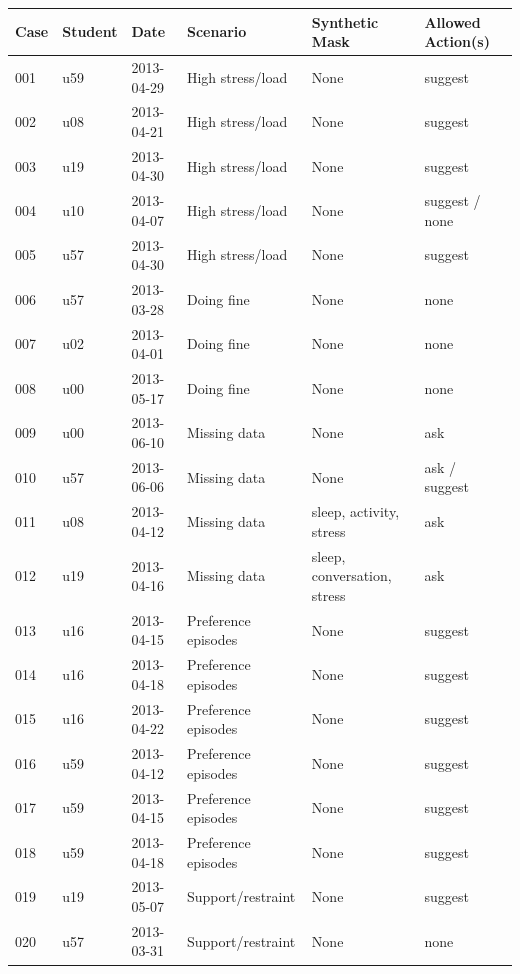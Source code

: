 \begin{tabular}{lllp{3.0cm}p{3.7cm}l}
\toprule
Case & Student & Date & Scenario & Synthetic Mask & Allowed Action(s) \\
\midrule
001 & u59 & 2013-04-29 & High stress/load & None & suggest \\
002 & u08 & 2013-04-21 & High stress/load & None & suggest \\
003 & u19 & 2013-04-30 & High stress/load & None & suggest \\
004 & u10 & 2013-04-07 & High stress/load & None & suggest / none \\
005 & u57 & 2013-04-30 & High stress/load & None & suggest \\
006 & u57 & 2013-03-28 & Doing fine & None & none \\
007 & u02 & 2013-04-01 & Doing fine & None & none \\
008 & u00 & 2013-05-17 & Doing fine & None & none \\
009 & u00 & 2013-06-10 & Missing data & None & ask \\
010 & u57 & 2013-06-06 & Missing data & None & ask / suggest \\
011 & u08 & 2013-04-12 & Missing data & sleep, activity, stress & ask \\
012 & u19 & 2013-04-16 & Missing data & sleep, conversation, stress & ask \\
013 & u16 & 2013-04-15 & Preference episodes & None & suggest \\
014 & u16 & 2013-04-18 & Preference episodes & None & suggest \\
015 & u16 & 2013-04-22 & Preference episodes & None & suggest \\
016 & u59 & 2013-04-12 & Preference episodes & None & suggest \\
017 & u59 & 2013-04-15 & Preference episodes & None & suggest \\
018 & u59 & 2013-04-18 & Preference episodes & None & suggest \\
019 & u19 & 2013-05-07 & Support/restraint & None & suggest \\
020 & u57 & 2013-03-31 & Support/restraint & None & none \\
\bottomrule
\end{tabular}

